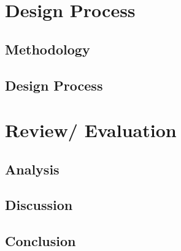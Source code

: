 \documentclass[UKenglish]{ifimaster}
\begin{document}
\part{Design Process}

\chapter{Methodology}


\chapter{Design Process}



\part{Review/ Evaluation }

\chapter{Analysis}


\chapter{Discussion}


\chapter{Conclusion}


\backmatter{}

\printbibliography[nottype=online]
\printbibliography[type=online,title={Web only}]

% 
\end{document}
